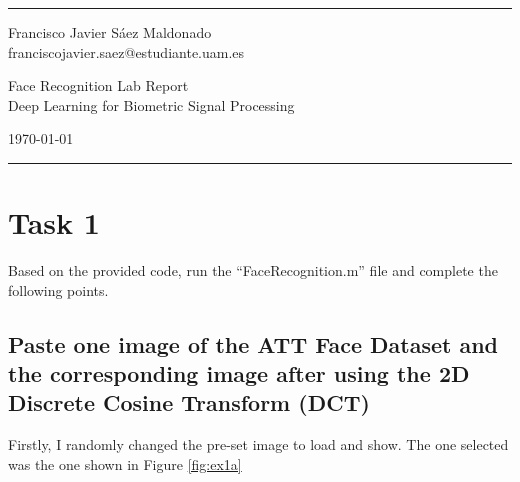 \documentclass[a4paper]{article}
\begin{document}

\fancyhead[C]{}
\hrule \medskip %
\begin{minipage}{0.295\textwidth}
\raggedright
\footnotesize
Francisco Javier Sáez Maldonado \hfill\\
franciscojavier.saez@estudiante.uam.es
\hfill\\
\end{minipage}
\begin{minipage}{0.4\textwidth}
\centering
\large
Face Recognition Lab Report\\
\normalsize
Deep Learning for Biometric Signal Processing\\
\end{minipage}
\begin{minipage}{0.295\textwidth}
\raggedleft
\today\hfill\\
\end{minipage}
\medskip\hrule

\section{Task 1}

Based on the provided code, run the “FaceRecognition.m” file and complete the following points.

\subsection{Paste one image of the ATT Face Dataset and the corresponding image after using the 2D Discrete Cosine Transform (DCT)}

Firstly, I randomly changed the pre-set image to load and show. The one selected was the one shown in Figure \ref{fig:ex1a}
\end{document}
